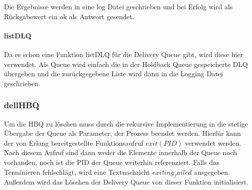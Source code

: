 Die Ergebnisse werden in eine log Datei geschrieben und bei Erfolg wird als Rückgabewert ein ok als Antwort gesendet.

\paragraph{listDLQ}
Da es schon eine Funktion listDLQ für die Delivery Queue gibt, wird diese hier verwendet. 
Als Queue wird einfach die in der Holdback Queue gespeicherte DLQ übergeben und die zurückgegebene Liste wird dann in die Logging Datei geschrieben. 

\subsubsection{dellHBQ}

Um die HBQ zu löschen muss durch die rekursive Implementierung in die stetige Übergabe der Queue als Parameter, der Prozess beendet werden. Hierfür kann der von Erlang bereitgestellte Funktionsaufruf $exit(PID)$ verwendet werden. Nach diesem Aufruf sind dann weder die Elemente innerhalb der Queue noch vorhanden, noch ist die PID der Queue weiterhin referenziert. Falls das Terminieren fehlschlägt, wird eine Textnachricht $exiting_failed$ ausgegeben. 
Außerdem wird das Löschen der Delivery Queue von dieser Funktion initialisiert. 